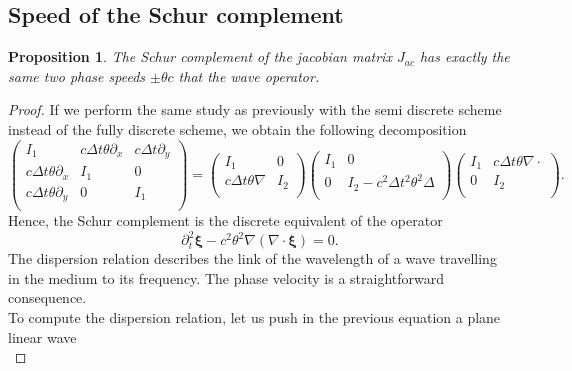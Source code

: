 \documentclass[a4paper, 11pt]{report}
\newtheorem{Proposition}{Proposition}
\begin{document}
\subsection{Speed of the Schur complement}
\begin{Proposition}
The Schur complement of the jacobian matrix $J_{ac}$ has exactly the same two phase speeds $\pm \theta c$ that the wave operator.
\end{Proposition}
\begin{proof}
If we perform the same study as previously with the semi discrete scheme instead of the fully discrete scheme, we obtain the following decomposition
\begin{equation*}
\begin{pmatrix}
I_1 & c\Delta t\theta \partial_x &c\Delta t\partial_y\\
c\Delta t\theta \partial_x &I_1&0\\
c\Delta t\theta\partial_y & 0 &I_1\\
\end{pmatrix}=
\begin{pmatrix}
I_1 & 0\\
c\Delta t\theta \nabla &I_2\\
\end{pmatrix}
\begin{pmatrix}
I_1 & 0\\
 0 &I_2-c^2\Delta t^2\theta^2\Delta\\
\end{pmatrix}
\begin{pmatrix}
I_1 & c\Delta t\theta \nabla\cdot\\
0 &I_2\\
\end{pmatrix}.
\end{equation*}
Hence, the Schur complement is the discrete equivalent of the operator
\begin{equation*}
\partial_t^2\boldsymbol{\xi}-c^2\theta^2\nabla\left(\nabla\cdot\boldsymbol{\xi}\right)=0.
\end{equation*}
The dispersion relation describes the link of the wavelength of a wave travelling in the medium to its frequency. The phase velocity is a straightforward consequence.  \\
To compute the dispersion relation, let us push in the previous equation a plane linear wave
\begin{equation*}

\end{equation*}
\end{proof}
\end{document}
